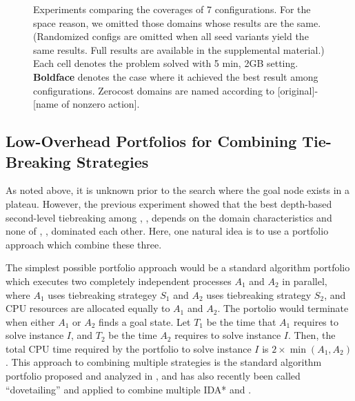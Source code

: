 
\begin{figure}[tb]
 \centering
 
 \caption{Experiments comparing the coverages of 7 configurations. For
 the space reason, we omitted those domains whose results are the
 same. (Randomized configs are omitted when all seed variants yield the
 same results. Full results are available in the supplemental material.)
 Each cell denotes the problem solved with 5 min, 2GB
 setting. \textbf{Boldface} denotes the case where it achieved the best
 result among configurations. Zerocost domains are named according to
 [original]-[name of nonzero action].}  \label{depth}
\end{figure}

\subsection{Low-Overhead Portfolios for Combining Tie-Breaking Strategies}

As noted above, it is unknown prior to the search where the goal node
exists in a plateau. However, the previous experiment showed that the
best depth-based second-level tiebreaking among \ld, \fd, \rd depends on
the domain characteristics and none of \ld, \fd, \rd dominated each
other.  Here, one natural idea is to use a portfolio approach which
combine these three.

The simplest possible portfolio approach would be a standard algorithm portfolio
which executes two completely independent \astar processes $A_1$ and $A_2$ in parallel, where $A_1$ uses tiebreaking strategey $S_1$ and $A_2$ uses tiebreaking strategy $S_2$, and CPU resources are allocated equally to $A_1$ and $A_2$.
The portolio would terminate when either $A_1$ or $A_2$ finds a goal state.
Let $T_1$ be the time that $A_1$ requires to solve instance $I$, and $T_2$ be the
time $A_2$ requires to solve instance $I$. Then, the total CPU time
required by the portfolio to solve instance $I$ is $2\times\min(A_1,A_2)$. This approach to combining multiple strategies is the standard algorithm portfolio proposed and analyzed in \cite{HubermanLH97,GomesS01}, and has also recently been called ``dovetailing'' and applied to combine multiple IDA* and \astar  \cite{ValenzanoSSBK10}. %

